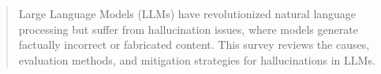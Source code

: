\begin{abstract}
Large Language Models (LLMs) have revolutionized natural language processing but suffer from hallucination issues, where models generate factually incorrect or fabricated content. This survey reviews the causes, evaluation methods, and mitigation strategies for hallucinations in LLMs.
\end{abstract}